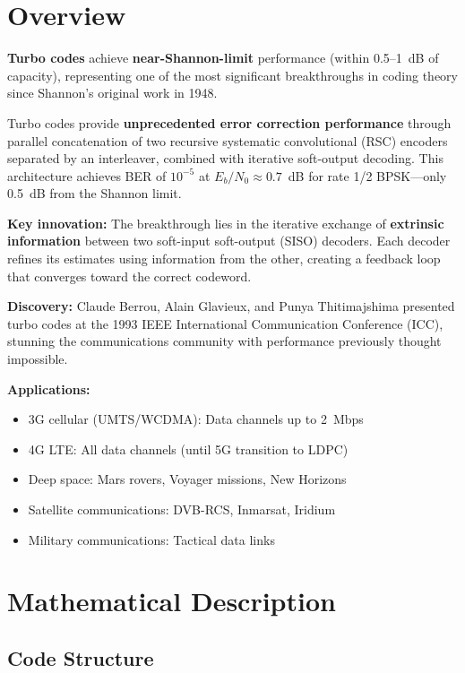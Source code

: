 \section{Overview}

\textbf{Turbo codes} achieve \textbf{near-Shannon-limit} performance (within 0.5--1~dB of capacity), representing one of the most significant breakthroughs in coding theory since Shannon's original work in 1948.

\begin{keyconcept}
Turbo codes provide \textbf{unprecedented error correction performance} through parallel concatenation of two recursive systematic convolutional (RSC) encoders separated by an interleaver, combined with iterative soft-output decoding. This architecture achieves BER of $10^{-5}$ at $E_b/N_0 \approx 0.7$~dB for rate 1/2 BPSK---only 0.5~dB from the Shannon limit.
\end{keyconcept}

\textbf{Key innovation:} The breakthrough lies in the iterative exchange of \textbf{extrinsic information} between two soft-input soft-output (SISO) decoders. Each decoder refines its estimates using information from the other, creating a feedback loop that converges toward the correct codeword.

\textbf{Discovery:} Claude Berrou, Alain Glavieux, and Punya Thitimajshima presented turbo codes at the 1993 IEEE International Communication Conference (ICC), stunning the communications community with performance previously thought impossible.

\textbf{Applications:}
\begin{itemize}
\item 3G cellular (UMTS/WCDMA): Data channels up to 2~Mbps
\item 4G LTE: All data channels (until 5G transition to LDPC)
\item Deep space: Mars rovers, Voyager missions, New Horizons
\item Satellite communications: DVB-RCS, Inmarsat, Iridium
\item Military communications: Tactical data links
\end{itemize}

\section{Mathematical Description}

\subsection{Code Structure}

